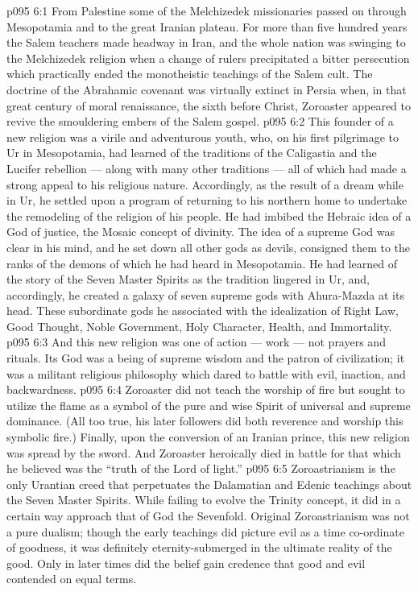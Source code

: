 \vs p095 6:1 From Palestine some of the Melchizedek missionaries passed on through Mesopotamia and to the great Iranian plateau. For more than five hundred years the Salem teachers made headway in Iran, and the whole nation was swinging to the Melchizedek religion when a change of rulers precipitated a bitter persecution which practically ended the monotheistic teachings of the Salem cult. The doctrine of the Abrahamic covenant was virtually extinct in Persia when, in that great century of moral renaissance, the sixth before Christ, Zoroaster appeared to revive the smouldering embers of the Salem gospel.
\vs p095 6:2 This founder of a new religion was a virile and adventurous youth, who, on his first pilgrimage to Ur in Mesopotamia, had learned of the traditions of the Caligastia and the Lucifer rebellion --- along with many other traditions --- all of which had made a strong appeal to his religious nature. Accordingly, as the result of a dream while in Ur, he settled upon a program of returning to his northern home to undertake the remodeling of the religion of his people. He had imbibed the Hebraic idea of a God of justice, the Mosaic concept of divinity. The idea of a supreme God was clear in his mind, and he set down all other gods as devils, consigned them to the ranks of the demons of which he had heard in Mesopotamia. He had learned of the story of the Seven Master Spirits as the tradition lingered in Ur, and, accordingly, he created a galaxy of seven supreme gods with Ahura\hyp{}Mazda at its head. These subordinate gods he associated with the idealization of Right Law, Good Thought, Noble Government, Holy Character, Health, and Immortality.
\vs p095 6:3 And this new religion was one of action --- work --- not prayers and rituals. Its God was a being of supreme wisdom and the patron of civilization; it was a militant religious philosophy which dared to battle with evil, inaction, and backwardness.
\vs p095 6:4 Zoroaster did not teach the worship of fire but sought to utilize the flame as a symbol of the pure and wise Spirit of universal and supreme dominance. (All too true, his later followers did both reverence and worship this symbolic fire.) Finally, upon the conversion of an Iranian prince, this new religion was spread by the sword. And Zoroaster heroically died in battle for that which he believed was the “truth of the Lord of light.”
\vs p095 6:5 \pc Zoroastrianism is the only Urantian creed that perpetuates the Dalamatian and Edenic teachings about the Seven Master Spirits. While failing to evolve the Trinity concept, it did in a certain way approach that of God the Sevenfold. Original Zoroastrianism was not a pure dualism; though the early teachings did picture evil as a time co\hyp{}ordinate of goodness, it was definitely eternity\hyp{}submerged in the ultimate reality of the good. Only in later times did the belief gain credence that good and evil contended on equal terms.
